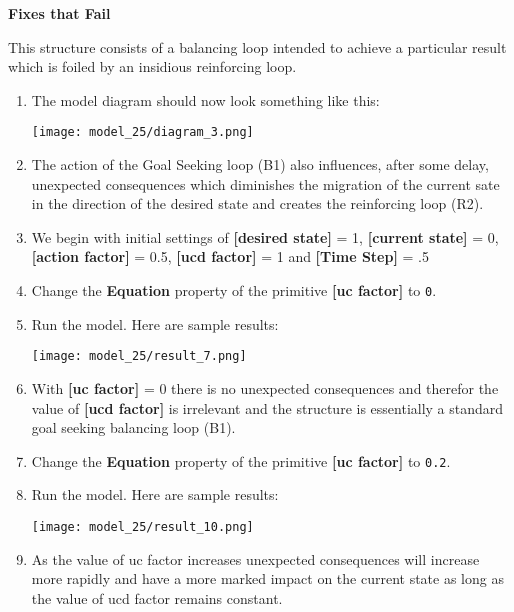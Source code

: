 \documentclass[]{memoir}
\makeatletter
\def\maxwidth{\ifdim\Gin@nat@width>\linewidth\linewidth
\else\Gin@nat@width\fi}
\let\Oldincludegraphics\includegraphics
\renewcommand{\includegraphics}[1]{\Oldincludegraphics[width=\maxwidth]{#1}}
\newcommand{\p}[1]{\textbf{{[}#1{]}}}
\newcommand{\e}[1]{\texttt{#1}}
\renewcommand{\a}[1]{\textbf{#1}}
\makeatother
\begin{document}
\begin{oframed}\textbf{Fixes that Fail} 

 This structure consists of a balancing loop intended to achieve a particular result which is foiled by an insidious reinforcing loop.

\begin{enumerate}
\item The model diagram should now look something like this: \par \begin{minipage}{\linewidth}  \centering \texttt{[image: model\_25/diagram\_3.png]}
\end{minipage}
\item 

The action of the Goal Seeking loop (B1) also influences, after some delay, unexpected consequences which diminishes the migration of the current sate in the direction of the desired state and creates the reinforcing loop (R2).


\item 

We begin with initial settings of \p{desired state} = 1, \p{current state} = 0, \p{action factor} = 0.5, \p{ucd factor} = 1 and \p{Time Step} = .5


\item  Change the \a{Equation} property of the primitive \p{uc factor} to \e{0}.
\item Run the model. Here are sample results:\par \begin{minipage}{\linewidth}  \centering \texttt{[image: model\_25/result\_7.png]}
\end{minipage}
\item 

With \p{uc factor} = 0 there is no unexpected consequences and therefor the value of \p{ucd factor} is irrelevant and the structure is essentially a standard goal seeking balancing loop (B1).


\item  Change the \a{Equation} property of the primitive \p{uc factor} to \e{0.2}.
\item Run the model. Here are sample results:\par \begin{minipage}{\linewidth}  \centering \texttt{[image: model\_25/result\_10.png]}
\end{minipage}
\item 

As the value of uc factor increases unexpected consequences will increase more rapidly and have a more marked impact on the current state as long as the value of ucd factor remains constant.



\end{enumerate} \end{oframed}
\end{document}
